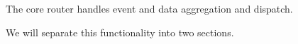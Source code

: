 The core router handles event and data aggregation and dispatch. 

We will separate this functionality into two sections. 

\


